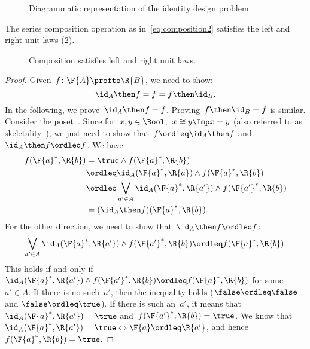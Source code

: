 \begin{figure}[h!]
  \begin{center}
  \end{center}
  \caption{Diagrammatic representation of the identity design problem. \label{fig:identitydp}}
\end{figure}

\begin{lemma}
  The series composition operation as in~\cref{eq:composition2} satisfies the left and right unit laws (\cref{fig:compositionunital}).
  \begin{figure}[h!]
    \begin{center}
    \end{center}
    \caption{Composition satisfies left and right unit laws. \label{fig:compositionunital}}
  \end{figure}
\end{lemma}

\begin{proof}
  Given~$f\colon \F{A}\profto \R{B}$, we need to show:
  \begin{equation*}
    \id_A \then f= f = f\then \id_B.
  \end{equation*}
  In the following, we prove~$\id_A \then f = f$. Proving~$f\then \id_B=f$ is similar.
  Consider the poset~\Bool. Since for~$x,y\in \Bool$,~$x\cong y \Imp x=y$ (also referred to as skeletality~\cite{fong2019}), we just need to show that~$f\ordleq \id_A\then f$ and~$\id_A\then f\ordleq f$.
  We have
  \begin{equation*}
    \begin{aligned}
      f(\F{a}^*,\R{b})&=\true \wedge f(\F{a}^*,\R{b})\\
      &\ordleq \id_A(\F{a}^*,\R{a}) \wedge f(\F{a}^*,\R{b})\\
      &\ordleq \bigvee_{a'\in A}\id_A(\F{a}^*,\R{a'})\wedge f(\F{a'}^*,\R{b})\\
      &=(\id_A\then f)(\F{a}^*,\R{b}).
    \end{aligned}
  \end{equation*}
  For the other direction, we need to show that~$\id_A\then f\ordleq f$:
  \begin{equation*}
    \bigvee_{a'\in A}\id_A(\F{a}^*,\R{a'})\wedge f(\F{a'}^*,\R{b}) \ordleq f(\F{a}^*,\R{b}).
  \end{equation*}
  This holds if and only if~$\id_A(\F{a}^*,\R{a'})\wedge f(\F{a'}^*,\R{b}) \ordleq f(\F{a}^*,\R{b})$ for some~$a'\in A$. If there is no such~$a'$, then the inequality holds ($\false \ordleq \false$ and $\false \ordleq \true$). If there is such an~$a'$, it means that~$\id_A(\F{a}^*,\R{a'})=\true$ and~$f(\F{a'}^*,\R{b})=\true$. We know that~$\id_A(\F{a}^*,\R{a'})=\true \Leftrightarrow \F{a}\ordleq \R{a'}$, and hence~$f(\F{a}^*,\R{b})=\true$.
\end{proof}
